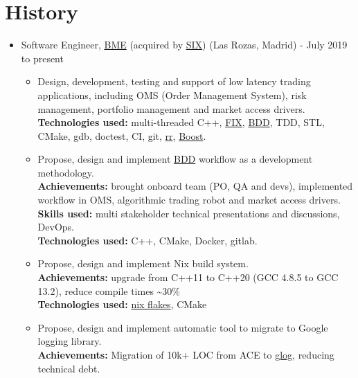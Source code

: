 \documentclass[11pt]{article}
\begin{document}
\section*{History}
\label{sec:org615d56b}
\begin{itemize}
\item Software Engineer, \href{https://www.bolsasymercados.es/ing/Home}{BME} (acquired by \href{https://www.six-group.com/en/home.html}{SIX}) (Las Rozas, Madrid) - July 2019 to present\\[0pt]
\begin{itemize}
\item Design, development, testing and support of low latency trading applications, including OMS (Order Management System), risk management, portfolio management and market access drivers.\\[0pt]
\textbf{Technologies used:} multi-threaded C++, \href{https://www.investopedia.com/terms/f/financial-information-exchange.asp}{FIX}, \href{https://www.agilealliance.org/glossary/bdd/}{BDD}, TDD, STL, CMake, gdb, doctest, CI, git, \href{https://rr-project.org}{rr}, \href{https://www.boost.org/}{Boost}.\\[0pt]
\item Propose, design and implement  \href{https://www.agilealliance.org/glossary/bdd/}{BDD} workflow as a development methodology.\\[0pt]
\textbf{Achievements:} brought onboard team (PO, QA and devs), implemented workflow in OMS, algorithmic trading robot and market access drivers.\\[0pt]
\textbf{Skills used:} multi stakeholder technical presentations and discussions, DevOps.\\[0pt]
\textbf{Technologies used:} C++, CMake, Docker, gitlab.\\[0pt]
\item Propose, design and implement Nix build system.\\[0pt]
\textbf{Achievements:} upgrade from C++11 to C++20 (GCC 4.8.5 to GCC 13.2), reduce compile times \textasciitilde{}30\%\\[0pt]
\textbf{Technologies used:} \href{https://nixos.wiki/wiki/Flakes}{nix flakes}, CMake\\[0pt]
\item Propose, design and implement automatic tool to migrate to Google logging library.\\[0pt]
\textbf{Achievements:} Migration of 10k+ LOC from ACE to \href{https://github.com/google/glog}{glog}, reducing technical debt.\\[0pt]

\end{itemize}
\end{itemize}
\end{document}
